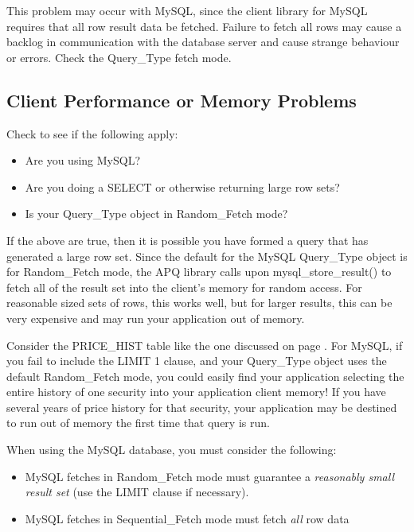\documentclass[english,letterpaper]{book}
\begin{document}
This problem may occur with MySQL, since the client library for MySQL
requires that all row result data be fetched. Failure to fetch all
rows may cause a backlog in communication with the database server
and cause strange behaviour or errors. Check the Query\_Type fetch
mode.


\subsection{Client Performance or Memory Problems}

Check to see if the following apply:

\begin{itemize}
   \item Are you using MySQL?
   \item Are you doing a SELECT or otherwise returning large row sets?
   \item Is your Query\_Type object in Random\_Fetch mode? 
\end{itemize}

If the above are true, then it is possible you have formed a query
that has generated a large row set. Since the default for the MySQL
Query\_Type object is for Random\_Fetch mode, the APQ library calls
upon mysql\_store\_result() to fetch all of the result set into the
client's memory for random access. For reasonable sized sets of rows,
this works well, but for larger results, this can be very expensive
and may run your application out of memory.

Consider the PRICE\_HIST table like the one discussed on page \pageref{PRICE_HIST Table Definition}.
For MySQL, if you fail to include the LIMIT 1 clause, and your Query\_Type
object uses the default Random\_Fetch mode, you could easily find
your application selecting the entire history of one security into
your application client memory! If you have several years of price
history for that security, your application may be destined to run
out of memory the first time that query is run.

When using the MySQL database, you must consider the following:

\begin{itemize}
   \item MySQL fetches in Random\_Fetch mode must guarantee a \emph{reasonably
         small result set} (use the LIMIT clause if necessary).
   \item MySQL fetches in Sequential\_Fetch mode must fetch \emph{all} row
         data
\end{itemize}
\end{document}
